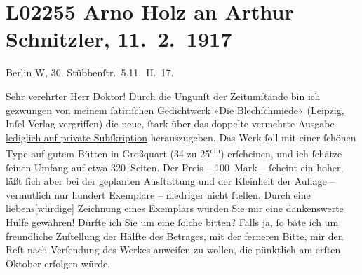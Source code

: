 

\section[Arno Holz an Arthur Schnitzler, 11. 2. 1917]{L02255 Arno Holz an Arthur Schnitzler, 11. 2. 1917}
\nopagebreak{}
\rehead{ }\normalsize\beginnumbering{}
\toendnotes[C]{\smallbreak\pagebreak[2]}
\toendnotes[C]{\smallbreak}
\pstart
           \raggedleft{}{\pb}Berlin W, 30. Stübbenſtr. 5.\hspace*{1.5em}11. II. 17.\pend
           
\pstart\center{}Sehr verehrter Herr Doktor!\pend\vspace{0.5em}
\pstart
           Durch die Ungunſt der Zeitumſtände bin ich gezwungen von meinem{ }ſatiriſchen
               Gedichtwerk »Die Blechſchmiede« (Leipzig, Inſel-Verlag vergriffen) die neue,{ }ſtark über das doppelte vermehrte Ausgabe
                  \uline{lediglich auf private Subſkription} herauszugeben.
               Das Werk{ }ſoll mit einer{ }ſchönen Type auf gutem Bütten in Großquart (34 zu 25\textsuperscript{cm}) erſcheinen, und ich{ }ſchätze{ }ſeinen Umfang auf etwa
               320 Seiten. Der Preis – 100 Mark –{ }ſcheint ein hoher, läßt{ }ſich aber bei der
               geplanten Ausſtattung und der Kleinheit der Auflage – vermutlich nur hundert
               Exemplare – niedriger nicht{ }ſtellen. Durch eine liebens{[}würdige{]}
               Zeichnung eines Exemplars würden Sie mir eine dankenswerte Hülfe gewähren! Dürfte ich
               Sie um eine{ }ſolche bitten? Falls ja,{ }ſo bäte ich um freundliche Zuſtellung der Hälfte
               des Betrages, mit der ferneren Bitte, mir den Reſt nach Verſendung des Werkes
               anweiſen zu wollen, die pünktlich am erſten Oktober erfolgen würde.\pend
           
